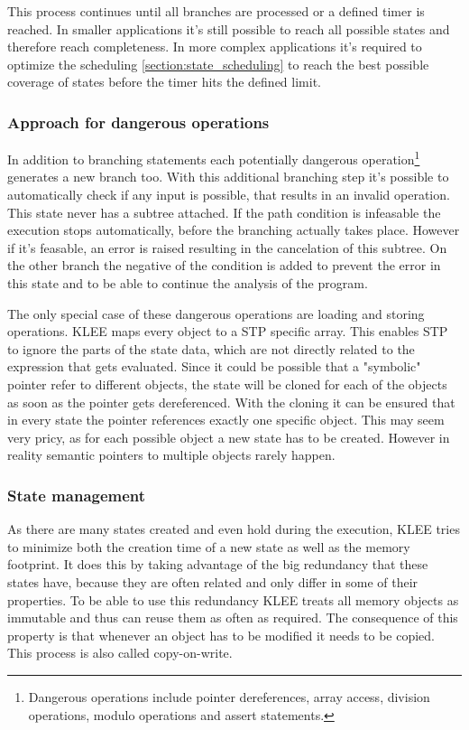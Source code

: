 This process continues until all branches are processed or a defined timer is reached. In smaller applications it's still possible to reach all possible states and therefore reach completeness. In more complex applications it's required to optimize the scheduling \ref{section:state_scheduling} to reach the best possible coverage of states before the timer hits the defined limit.
\subsubsection{Approach for dangerous operations}\label{section:dangerous_operations}
In addition to branching statements each potentially dangerous operation\footnote{Dangerous operations include pointer dereferences, array access, division operations, modulo operations and assert statements.} generates a new branch too. With this additional branching step it's possible to automatically check if any input is possible, that results in an invalid operation. This state never has a subtree attached. If the path condition is infeasable the execution stops automatically, before the branching actually takes place. However if it's feasable, an error is raised resulting in the cancelation of this subtree. On the other branch the negative of the condition is added to prevent the error in this state and to be able to continue the analysis of the program.

The only special case of these dangerous operations are loading and storing operations. KLEE maps every object to a STP specific array. This enables STP to ignore the parts of the state data, which are not directly related to the expression that gets evaluated. Since it could be possible that a "symbolic" pointer refer to different objects, the state will be cloned for each of the objects as soon as the pointer gets dereferenced. With the cloning it can be ensured that in every state the pointer references exactly one specific object. This may seem very pricy, as for each possible object a new state has to be created. However in reality semantic pointers to multiple objects rarely happen. 

\subsubsection{State management}
As there are many states created and even hold during the execution, KLEE tries to minimize both the creation time of a new state as well as the memory footprint. It does this by taking advantage of the big redundancy that these states have, because they are often related and only differ in some of their properties. To be able to use this redundancy KLEE treats all memory objects as immutable and thus can reuse them as often as required. The consequence of this property is that whenever an object has to be modified it needs to be copied. This process is also called copy-on-write.

